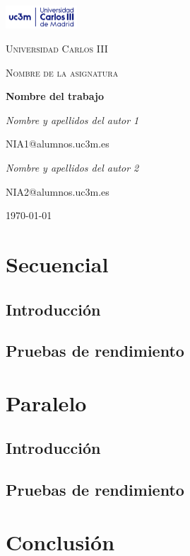 \documentclass[12pt,a4paper]{article}
\begin{document}
\begin{titlepage}
	\centering
	\includegraphics[width=0.2\textwidth]{images/uc3m.png}\par\vspace{1cm}
	{\scshape\LARGE Universidad Carlos III \par}
	\vspace{1cm}
	{\scshape\Large Nombre de la asignatura\par}
	\vspace{1.5cm}
	{\huge\bfseries Nombre del trabajo\par}
	\vspace{2cm}
	{\Large\itshape Nombre y apellidos del autor 1\par}
	{\Large NIA1@alumnos.uc3m.es\par}
	\vspace{1cm}
	{\Large\itshape Nombre y apellidos del autor 2\par}
	{\Large NIA2@alumnos.uc3m.es\par}
	\vfill
	
	{\large \today\par}
\end{titlepage}

\tableofcontents

\newpage
  \section{Secuencial}
  \subsection{Introducción}
  \noindent
  \subsection{Pruebas de rendimiento}
  \noindent
\newpage
\section{Paralelo}
  \subsection{Introducción}
  \noindent
  \subsection{Pruebas de rendimiento}
  \noindent
\newpage
\section{Conclusión}
\end{document}
